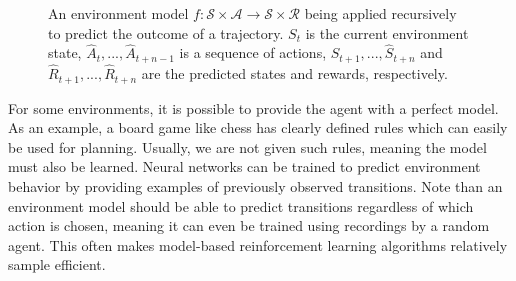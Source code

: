 \begin{figure}[ht]
    \centering
    \caption{An environment model $f : \mathscr{S} \times \mathscr{A} \to \mathscr{S} \times \mathscr{R}$ being applied recursively to predict the outcome of a trajectory. $S_t$ is the current environment state, $\hat{A}_t, ..., \hat{A}_{t+n-1}$ is a sequence of actions, $\hat{S}_{t+1}, ..., \hat{S}_{t+n}$ and $\hat{R}_{t+1}, ..., \hat{R}_{t+n}$ are the predicted states and rewards, respectively.}
    \label{fig:recursive_model}
\end{figure}

For some environments, it is possible to provide the agent with a perfect model. As an example, a board game like chess has clearly defined rules which can easily be used for planning. Usually, we are not given such rules, meaning the model must also be learned. Neural networks can be trained to predict environment behavior by providing examples of previously observed transitions. Note than an environment model should be able to predict transitions regardless of which action is chosen, meaning it can even be trained using recordings by a random agent. This often makes model-based reinforcement learning algorithms relatively sample efficient.

